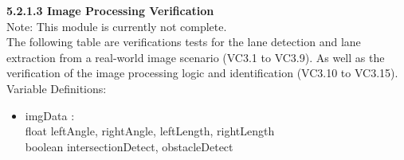 \documentclass [10pt]{article}
\begin{document}
\begin{longtable}{ | p{ } | p{ } |  p{ } |  p{ } | p{ } | p{ } |  p{ } |}
    \end{longtable}
    
    
    
 
    \newpage
    

    \textbf{5.2.1.3 Image Processing Verification} \vspace{2mm}\\
    Note: This module is currently not complete. \\
    The following table are verifications tests for the lane detection and lane extraction from a real-world image scenario (VC3.1 to VC3.9). As well as the verification of the image processing logic and identification (VC3.10 to VC3.15). \\
    Variable Definitions: \\ 
    \begin{itemize}[topsep=0pt]
        \item imgData : \\ 
            float leftAngle,  rightAngle,  leftLength, rightLength \\
            boolean intersectionDetect, obstacleDetect
    \end{itemize}
    
\end{document}
